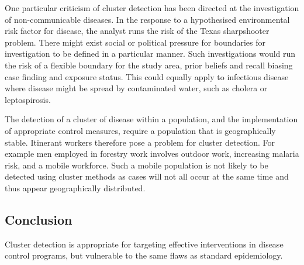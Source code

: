 \documentclass[a4paper,11pt]{article}
\begin{document}
One particular criticism of cluster detection has been directed at the investigation of non-communicable diseases.
In the response to a hypothesised environmental risk factor for disease, the analyst runs the risk of the Texas sharpshooter problem. \cite{Rothman1990, Elliott2004}
There might exist social or political pressure for boundaries for investigation to be defined in a particular manner.
Such investigations would run the risk of a flexible boundary for the study area, prior beliefs and recall biasing case finding and exposure status. 
This could equally apply to infectious disease where disease might be spread by contaminated water, such as cholera or leptospirosis. 

The detection of a cluster of disease within a population, and the implementation of appropriate control measures, require a population that is geographically stable. 
Itinerant workers therefore pose a problem for cluster detection. 
For example men employed in forestry work involves outdoor work, increasing malaria risk, and a mobile workforce. 
Such a mobile population is not likely to be detected using cluster methods as cases will not all occur at the same time and thus appear geographically distributed.\cite{Cotter2013}

\subsection{Conclusion}
Cluster detection is appropriate for targeting effective interventions in disease control programs, but vulnerable to the same flaws as standard epidemiology. 
\end{document}
